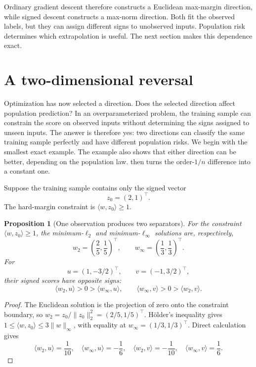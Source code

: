 \documentclass[11pt,twoside]{article}
\newtheorem{proposition}[theorem]{Proposition}
\theoremstyle{definition}
\theoremstyle{remark}
\begin{document}
Ordinary gradient descent therefore constructs a Euclidean max-margin
direction, while signed descent constructs a max-norm direction. Both fit the
observed labels, but they can assign different signs to unobserved inputs.
Population risk determines which extrapolation is useful. The next section
makes this dependence exact.

\section{A two-dimensional reversal}
\label{sec:two-dimensional}

Optimization has now selected a direction. Does the selected direction affect
population prediction? In an overparameterized problem, the training sample
can constrain the score on observed inputs without determining the signs
assigned to
unseen inputs. The answer is therefore yes: two directions can classify the
same training sample perfectly and have different population risks. We begin
with the smallest exact example. The example also shows that either direction
can be
better, depending on the population law.  then turns
the order-$1/n$ difference into a constant one.

Suppose the training sample contains only the signed vector
\[
 z_0=(2,1)^\top.
\]
The hard-margin constraint is $\langle w,z_0\rangle\ge1$.

\begin{proposition}[One observation produces two separators]
\label{prop:two-selectors}
For the constraint $\langle w,z_0\rangle\ge1$, the minimum-$\ell_2$ and
minimum-$\ell_\infty$ solutions are, respectively,
\[
 w_2=\left(\frac25,\frac15\right)^\top,
 \qquad
 w_\infty=\left(\frac13,\frac13\right)^\top.
\]
For
\[
 u=(1,-3/2)^\top,
 \qquad
 v=(-1,3/2)^\top,
\]
their signed scores have opposite signs:
\[
 \langle w_2,u\rangle>0>\langle w_\infty,u\rangle,
 \qquad
 \langle w_\infty,v\rangle>0>\langle w_2,v\rangle.
\]
\end{proposition}

\begin{proof}
The Euclidean solution is the projection of zero onto the constraint
boundary, so $w_2=z_0/\|z_0\|_2^2=(2/5,1/5)^\top$. H\"older's inequality
gives $1\le\langle w,z_0\rangle\le3\|w\|_\infty$, with equality at
$w_\infty=(1/3,1/3)^\top$. Direct calculation gives
\[
 \langle w_2,u\rangle=\frac1{10},\quad
 \langle w_\infty,u\rangle=-\frac16,
 \quad
 \langle w_2,v\rangle=-\frac1{10},\quad
 \langle w_\infty,v\rangle=\frac16.
\]
\end{proof}
\end{document}
